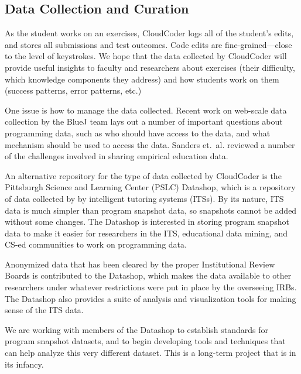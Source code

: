 \documentclass{sig-alternate}
\begin{document}
\subsection{Data Collection and Curation}

As the student works on an exercises, CloudCoder logs all of the
student's edits, and stores all submissions and test outcomes.
Code edits are fine-grained---close to the level of keystrokes.
We hope that the data collected by CloudCoder will provide
useful insights to faculty and researchers about
exercises (their difficulty, which knowledge components they address)
and how students work on them (success patterns, error patterns, etc.)

One issue is how to manage the data collected.  
Recent work on web-scale data collection by the
BlueJ team\cite{Utting:2012:WDG:2361276.2361278} lays out a number of important
questions about programming data, such as who should have access to the data, and what
mechanism should be used to access the data.  Sanders
et.\ al.\cite{Sanders:2008:DSE:1404520.1404534} reviewed a number of
the challenges involved in sharing empirical education data.  

An alternative repository for the type of data collected by CloudCoder
is the Pittsburgh Science and Learning Center (PSLC) Datashop, which
is a repository of data collected by by intelligent tutoring
systems (ITSs).  By its nature, ITS data is much simpler than program
snapshot data, so snapshots cannot be added without some changes.
The Datashop is interested in storing program
snapshot data to make it easier for researchers in the ITS, educational data
mining, and CS-ed communities to work on programming data.

Anonymized data that has been cleared by the proper Institutional
Review Boards is contributed to the Datashop, which
makes the data available to other researchers under whatever
restrictions were put in place by the overseeing IRBs.  The Datashop also
provides a suite of analysis and visualization tools for making
sense of the ITS data.

We are working with members of the Datashop to establish standards for
program snapshot datasets, and to begin developing tools and
techniques that can help analyze this very different dataset.  This is
a long-term project that is in its infancy.
\end{document}
